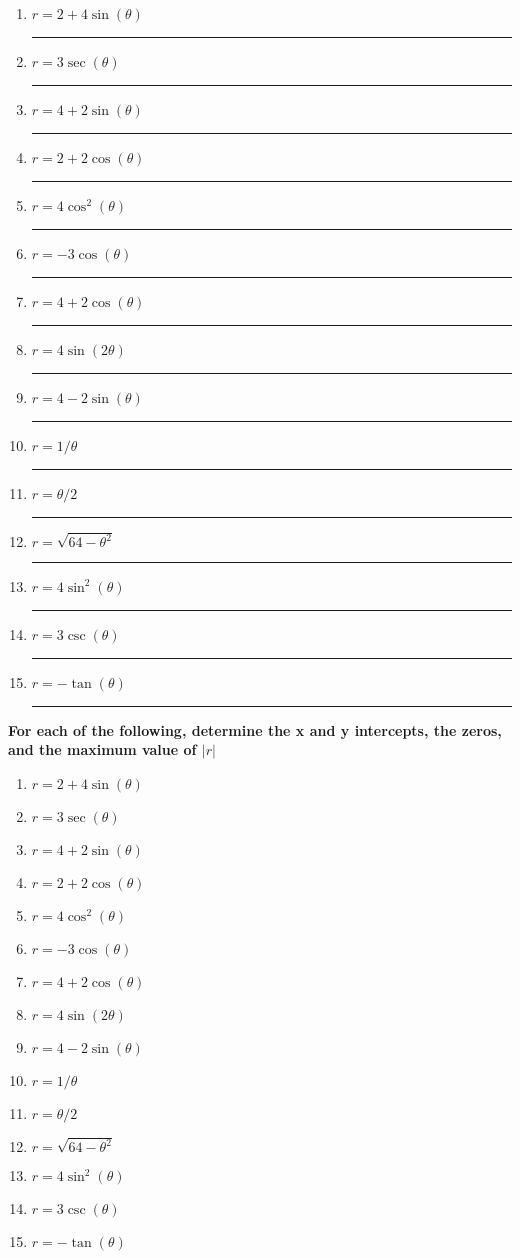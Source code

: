 \documentclass[12pt]{exam}
\begin{document}
\newcommand\aline[1]{\rule{0.5in}{0.2pt} }
\vspace{2ex}
\begin{multicols}{3}
	\begin{enumerate}
		\item $r = 2+4\sin(\theta)$ \aline{D} %
		\item $r = 3\sec(\theta)$ \aline{J} %
		\item $r = 4 + 2 \sin(\theta)$ \aline{X}
		\item $r=2+2\cos(\theta)$ \aline{F} %
		\item $r = 4\cos^2(\theta)$ \aline{C} %
		\item $r = -3\cos(\theta)$ \aline{A} %
		\item $r  = 4 + 2 \cos(\theta)$ \aline{X}
		\item $r = 4\sin(2\theta)$ \aline{B} %
		\item $r=4-2\sin(\theta)$ \aline{E} %
		\item $r=1/\theta$ \aline{G} %
		\item $r = \theta/2$ \aline{K} %
		\item $r = \sqrt{64-\theta^2}$ \aline{H} %
		\item $r = 4\sin^2(\theta)$ \aline{I} %
		\item $r = 3\csc(\theta)$ \aline{L} %
		\item $r = -\tan(\theta)$ \aline{X}
	\end{enumerate}
	\end{multicols}
\clearpage

\textbf{For each of the following, determine the x and y intercepts, the
 zeros, and the maximum value of $|r|$}
 \begin{multicols}{2}
 \begin{enumerate}
	\setlength{\itemsep}{12ex}
	\item $r = 2+4\sin(\theta)$  %
	\item $r = 3\sec(\theta)$  %
	\item $r = 4 + 2 \sin(\theta)$
	\item $r=2+2\cos(\theta)$  %
	\item $r = 4\cos^2(\theta)$  %
	\item $r = -3\cos(\theta)$  %
	\item $r  = 4 + 2 \cos(\theta)$
	\item $r = 4\sin(2\theta)$  %
	\item $r=4-2\sin(\theta)$  %
	\item $r=1/\theta$  %
	\item $r = \theta/2$  %
	\item $r = \sqrt{64-\theta^2}$  %
	\item $r = 4\sin^2(\theta)$  %
	\item $r = 3\csc(\theta)$  %
	\item $r = -\tan(\theta)$
\end{enumerate}
\end{multicols}
\end{document}
